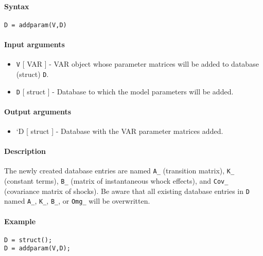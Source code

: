 


	\paragraph{Syntax}\label{syntax}

\begin{verbatim}
D = addparam(V,D)
\end{verbatim}

\paragraph{Input arguments}\label{input-arguments}

\begin{itemize}
\item
  \texttt{V} {[} VAR {]} - VAR object whose parameter matrices will be
  added to database (struct) \texttt{D}.
\item
  \texttt{D} {[} struct {]} - Database to which the model parameters
  will be added.
\end{itemize}

\paragraph{Output arguments}\label{output-arguments}

\begin{itemize}
\itemsep1pt\parskip0pt
\item
  `D {[} struct {]} - Database with the VAR parameter matrices added.
\end{itemize}

\paragraph{Description}\label{description}

The newly created database entries are named \texttt{A\_} (transition
matrix), \texttt{K\_} (constant terms), \texttt{B\_} (matrix of
instantaneous whock effects), and \texttt{Cov\_} (covariance matrix of
shocks). Be aware that all existing database entries in \texttt{D} named
\texttt{A\_}, \texttt{K\_}, \texttt{B\_}, or \texttt{Omg\_} will be
overwritten.

\paragraph{Example}\label{example}

\begin{verbatim}
D = struct();
D = addparam(V,D);
\end{verbatim}


